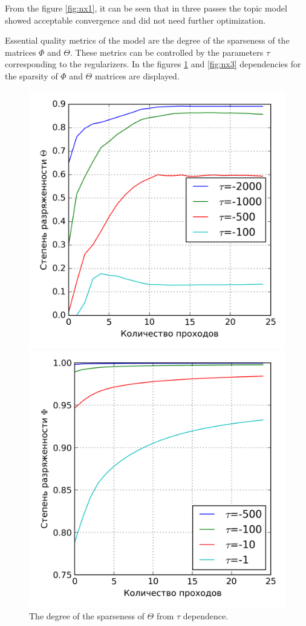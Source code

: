 \documentclass[12pt]{report}
\theoremstyle{definition}
\begin{document}
From the figure \ref{fig:nx1}, it can be seen that in three passes the topic model showed acceptable convergence and did not need further optimization. 

Essential quality metrics of the model are the degree of the sparseness of the matrices $\Phi$ and $\Theta$. 
These metrics can be controlled by the parameters $\tau$ corresponding to the regularizers. 
In the figures \ref{fig:nx2} and \ref{fig:nx3} dependencies for the sparsity of $\Phi$ and $\Theta$ matrices are displayed.

\begin{figure}
	\centering
	\begin{minipage}{.5\textwidth}
		\centering
		\includegraphics[width=0.9\linewidth]{nx2}
		\caption{The degree of the sparseness of $\Theta$ from $\tau$ dependence.}
		\label{fig:nx2}
	\end{minipage}%
	\begin{minipage}{.5\textwidth}
		\centering
		\includegraphics[width=0.9\linewidth]{nx3}

\end{minipage}
\end{figure}
\end{document}
